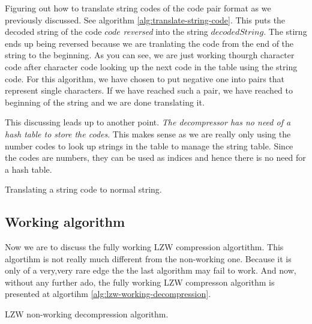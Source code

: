 \begin{refsection}
Figuring out how to translate string codes of the code pair format as we
previously discussed. See algorithm
\ref{alg:translate-string-code}. This puts the decoded string of the
code $code$ \textit{reversed} into the string $decodedString$. The
stirng ends up being reversed because we are tranlating the code from
the end of the string to the beginning. As you can see, we are just
working thourgh character code after character code looking up the
next code in the table using the string code. For this algorithm, we
have chosen to put negative one into pairs that represent single
characters. If we have reached such a pair, we have reached to
beginning of the string and we are done translating it.

This discussing leads up to another point. \textit{The decompressor
  has no need of a hash table to store the codes}. This makes sense as
we are really only using the number codes to look up strings in the
table to manage the string table. Since the codes are numbers, they
can be used as indices and hence there is no need for a hash table.

\begin{algorithm}[H]
  \caption{Translating a string code to normal string.}
  \label{alg:translate-string-code}
  \begin{algorithmic}[1]
    \While{\True}

        \Break
      \Else
      \EndIf
    \EndWhile
  \end{algorithmic}
\end{algorithm}

\subsection{Working algorithm}

Now we are to discuss the fully working LZW compression
algortithm. This algortihm is not really much different from the
non-working one. Because it is only of a very,very rare edge the the
last algorithm may fail to work. And now, without any further ado, the
fully working LZW compresson algorithm is presented at algortihm
\ref{alg:lzw-working-decompression}.

\begin{algorithm}[H]
  \caption{LZW non-working decompression algorithm.}
  \label{alg:lzw-working-decompression}
  \begin{algorithmic}[1]
    \State {}


\end{algorithmic}
\end{algorithm}
\end{refsection}
